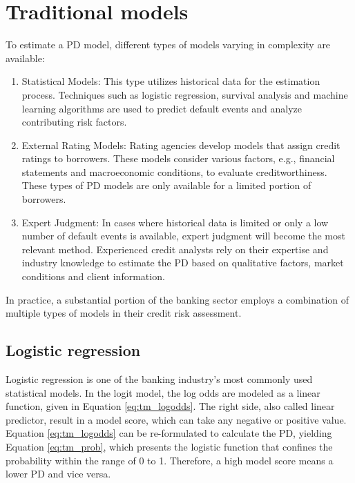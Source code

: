 \chapter{Traditional models}
\label{ch:TM}

To estimate a PD model, different types of models varying in complexity are available:

\begin{enumerate}
  \item Statistical Models: This type utilizes historical data for the estimation process. Techniques such as logistic regression, survival analysis and machine learning algorithms are used to predict default events and analyze contributing risk factors.
  \item External Rating Models: Rating agencies develop models that assign credit ratings to borrowers. These models consider various factors, e.g., financial statements and macroeconomic conditions, to evaluate creditworthiness. These types of PD models are only available for a limited portion of borrowers. 
  \item Expert Judgment: In cases where historical data is limited or only a low number of default events is available, expert judgment will become the most relevant method. Experienced credit analysts rely on their expertise and industry knowledge to estimate the PD based on qualitative factors, market conditions and client information.
\end{enumerate}

In practice, a substantial portion of the banking sector employs a combination of multiple types of models in their credit risk assessment.

\section{Logistic regression}
Logistic regression is one of the banking industry's most commonly used statistical models. In the logit model, the log odds are modeled as a linear function, given in Equation \ref{eq:tm_logodds}. The right side, also called  linear predictor, result in a model score, which can take any negative or positive value. Equation \ref{eq:tm_logodds} can be re-formulated to calculate the \ac{PD}, yielding Equation \ref{eq:tm_prob}, which presents the logistic function that confines the probability within the range of 0 to 1. Therefore, a high model score means a lower \ac{PD} and vice versa. \cite[283]{Kuhn:2013}

